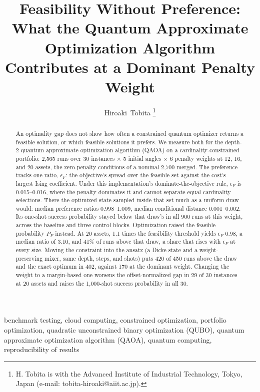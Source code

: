 \documentclass[journal]{IEEEtran}
\begin{document}
\title{Feasibility Without Preference: What the Quantum Approximate Optimization Algorithm Contributes at a Dominant Penalty Weight}

\author{Hiroaki~Tobita%
\thanks{H. Tobita is with the Advanced Institute of Industrial Technology,
Tokyo, Japan (e-mail: tobita-hiroaki@aiit.ac.jp).}}

\maketitle



\begin{abstract}
An optimality gap does not show how often a constrained quantum optimizer returns a feasible solution, or which feasible solutions it prefers. We measure both for the depth-2 quantum approximate optimization algorithm (QAOA) on a cardinality-constrained portfolio: 2,565 runs over 30 instances $\times$ 5 initial angles $\times$ 6 penalty weights at 12, 16, and 20 assets, the zero-penalty conditions of a nominal 2,700 merged. The preference tracks one ratio, $\epsilon_{F}$: the objective's spread over the feasible set against the cost's largest Ising coefficient. Under this implementation's dominate-the-objective rule, $\epsilon_{F}$ is 0.015--0.016, where the penalty dominates it and cannot separate equal-cardinality selections. There the optimized state sampled inside that set much as a uniform draw would: median preference ratios 0.998--1.009, median conditional distance 0.001--0.002. Its one-shot success probability stayed below that draw's in all 900 runs at this weight, across the baseline and three control blocks. Optimization raised the feasible probability $P_{F}$ instead. At 20 assets, 1.1 times the feasibility threshold yields $\epsilon_{F}$ 0.98, a median ratio of 3.10, and 41\% of runs above that draw, a share that rises with $\epsilon_{F}$ at every size. Moving the constraint into the ansatz (a Dicke state and a weight-preserving mixer, same depth, steps, and shots) puts 420 of 450 runs above the draw and the exact optimum in 402, against 170 at the dominant weight. Changing the weight to a margin-based one worsens the offset-normalized gap in 29 of 30 instances at 20 assets and raises the 1,000-shot success probability in all 30.
\end{abstract}

\begin{IEEEkeywords}
benchmark testing, cloud computing, constrained optimization, portfolio optimization, quadratic unconstrained binary optimization (QUBO), quantum approximate optimization algorithm (QAOA), quantum computing, reproducibility of results
\end{IEEEkeywords}
\end{document}

